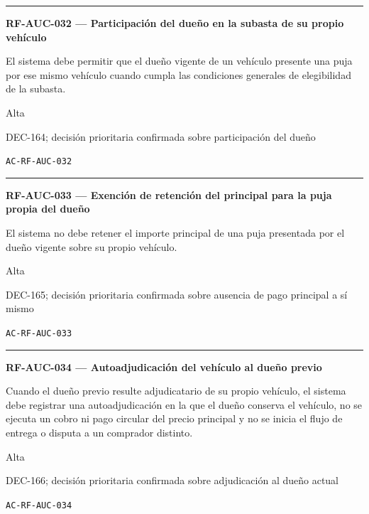 \documentclass[10pt,letterpaper]{article}
\begin{document}
\vspace{0.25em}\hrule\vspace{0.65em}
\noindent\textbf{RF-AUC-032 --- Participación del dueño en la subasta de su propio vehículo}\par
\begin{description}[style=nextline,leftmargin=3.15cm,labelwidth=2.8cm,font=\normalfont\bfseries]
\item[Obligación] El sistema debe permitir que el dueño vigente de un vehículo presente una puja por ese mismo vehículo cuando cumpla las condiciones generales de elegibilidad de la subasta.
\item[Prioridad] Alta
\item[Procedencia] DEC-164; decisión prioritaria confirmada sobre participación del dueño
\item[Verificación] \texttt{AC-RF-AUC-032}
\end{description}
\vspace{0.25em}\hrule\vspace{0.65em}
\noindent\textbf{RF-AUC-033 --- Exención de retención del principal para la puja propia del dueño}\par
\begin{description}[style=nextline,leftmargin=3.15cm,labelwidth=2.8cm,font=\normalfont\bfseries]
\item[Obligación] El sistema no debe retener el importe principal de una puja presentada por el dueño vigente sobre su propio vehículo.
\item[Prioridad] Alta
\item[Procedencia] DEC-165; decisión prioritaria confirmada sobre ausencia de pago principal a sí mismo
\item[Verificación] \texttt{AC-RF-AUC-033}
\end{description}
\vspace{0.25em}\hrule\vspace{0.65em}
\noindent\textbf{RF-AUC-034 --- Autoadjudicación del vehículo al dueño previo}\par
\begin{description}[style=nextline,leftmargin=3.15cm,labelwidth=2.8cm,font=\normalfont\bfseries]
\item[Obligación] Cuando el dueño previo resulte adjudicatario de su propio vehículo, el sistema debe registrar una autoadjudicación en la que el dueño conserva el vehículo, no se ejecuta un cobro ni pago circular del precio principal y no se inicia el flujo de entrega o disputa a un comprador distinto.
\item[Prioridad] Alta
\item[Procedencia] DEC-166; decisión prioritaria confirmada sobre adjudicación al dueño actual
\item[Verificación] \texttt{AC-RF-AUC-034}
\end{description}
\end{document}
